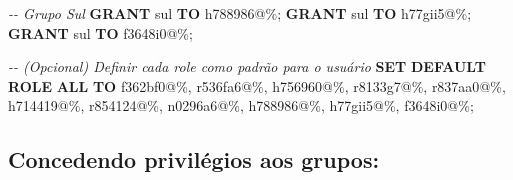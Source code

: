 \documentclass[
]{book}
\newenvironment{Shaded}{\begin{snugshade}}{\end{snugshade}}
\newcommand{\CommentTok}[1]{\textcolor[rgb]{0.56,0.35,0.01}{\textit{#1}}}
\newcommand{\KeywordTok}[1]{\textcolor[rgb]{0.13,0.29,0.53}{\textbf{#1}}}
\newcommand{\NormalTok}[1]{#1}
\newcommand{\StringTok}[1]{\textcolor[rgb]{0.31,0.60,0.02}{#1}}
\begin{document}
\begin{Shaded}
\begin{Highlighting}[]
\CommentTok{{-}{-} Grupo Sul}
\KeywordTok{GRANT} \StringTok{\textquotesingle{}sul\textquotesingle{}} \KeywordTok{TO} \StringTok{\textquotesingle{}h788986\textquotesingle{}}\NormalTok{@}\StringTok{\textquotesingle{}\%\textquotesingle{}}\NormalTok{;}
\KeywordTok{GRANT} \StringTok{\textquotesingle{}sul\textquotesingle{}} \KeywordTok{TO} \StringTok{\textquotesingle{}h77gii5\textquotesingle{}}\NormalTok{@}\StringTok{\textquotesingle{}\%\textquotesingle{}}\NormalTok{;}
\KeywordTok{GRANT} \StringTok{\textquotesingle{}sul\textquotesingle{}} \KeywordTok{TO} \StringTok{\textquotesingle{}f3648i0\textquotesingle{}}\NormalTok{@}\StringTok{\textquotesingle{}\%\textquotesingle{}}\NormalTok{;}

\CommentTok{{-}{-} (Opcional) Definir cada role como padrão para o usuário}
\KeywordTok{SET} \KeywordTok{DEFAULT} \KeywordTok{ROLE} \KeywordTok{ALL} \KeywordTok{TO}
    \StringTok{\textquotesingle{}f362bf0\textquotesingle{}}\NormalTok{@}\StringTok{\textquotesingle{}\%\textquotesingle{}}\NormalTok{,}
    \StringTok{\textquotesingle{}r536fa6\textquotesingle{}}\NormalTok{@}\StringTok{\textquotesingle{}\%\textquotesingle{}}\NormalTok{,}
    \StringTok{\textquotesingle{}h756960\textquotesingle{}}\NormalTok{@}\StringTok{\textquotesingle{}\%\textquotesingle{}}\NormalTok{,}
    \StringTok{\textquotesingle{}r8133g7\textquotesingle{}}\NormalTok{@}\StringTok{\textquotesingle{}\%\textquotesingle{}}\NormalTok{,}
    \StringTok{\textquotesingle{}r837aa0\textquotesingle{}}\NormalTok{@}\StringTok{\textquotesingle{}\%\textquotesingle{}}\NormalTok{,}
    \StringTok{\textquotesingle{}h714419\textquotesingle{}}\NormalTok{@}\StringTok{\textquotesingle{}\%\textquotesingle{}}\NormalTok{,}
    \StringTok{\textquotesingle{}r854124\textquotesingle{}}\NormalTok{@}\StringTok{\textquotesingle{}\%\textquotesingle{}}\NormalTok{,}
    \StringTok{\textquotesingle{}n0296a6\textquotesingle{}}\NormalTok{@}\StringTok{\textquotesingle{}\%\textquotesingle{}}\NormalTok{,}
    \StringTok{\textquotesingle{}h788986\textquotesingle{}}\NormalTok{@}\StringTok{\textquotesingle{}\%\textquotesingle{}}\NormalTok{,}
    \StringTok{\textquotesingle{}h77gii5\textquotesingle{}}\NormalTok{@}\StringTok{\textquotesingle{}\%\textquotesingle{}}\NormalTok{,}
    \StringTok{\textquotesingle{}f3648i0\textquotesingle{}}\NormalTok{@}\StringTok{\textquotesingle{}\%\textquotesingle{}}\NormalTok{;}
\end{Highlighting}
\end{Shaded}

\subsection{Concedendo privilégios aos grupos:}\label{concedendo-priviluxe9gios-aos-grupos}
\end{document}
